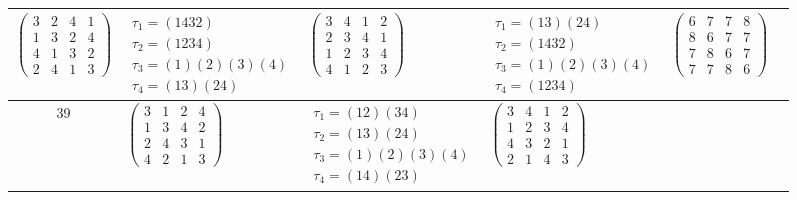 \begin{longtable}{|c|p{2.7cm}|p{2.7cm}|p{2.7cm}|p{2.7cm}|p{2.7cm}|}
    $\begin{pmatrix} 3 & 2 & 4 & 1 \\ 1 & 3 & 2 & 4 \\ 4 & 1 & 3 & 2 \\ 2 & 4 & 1 & 3 \end{pmatrix}$               &
    $\begin{array}{l}\tau_{1}=(1432)\\ \tau_{2}=(1234)\\ \tau_{3}=(1)(2)(3)(4)\\ \tau_{4}=(13)(24)\end{array}$     &
    $\begin{pmatrix} 3 & 4 & 1 & 2 \\ 2 & 3 & 4 & 1 \\ 1 & 2 & 3 & 4 \\ 4 & 1 & 2 & 3 \end{pmatrix}$               &
    $\begin{array}{l}\tau_{1}=(13)(24)\\ \tau_{2}=(1432)\\ \tau_{3}=(1)(2)(3)(4)\\ \tau_{4}=(1234)\end{array}$     &
    $\begin{pmatrix} 6 & 7 & 7 & 8 \\ 8 & 6 & 7 & 7 \\ 7 & 8 & 6 & 7 \\ 7 & 7 & 8 & 6 \end{pmatrix}$                                                                                           \\
    \hline
    39                                                                                                             &
    $\begin{pmatrix} 3 & 1 & 2 & 4 \\ 1 & 3 & 4 & 2 \\ 2 & 4 & 3 & 1 \\ 4 & 2 & 1 & 3 \end{pmatrix}$               &
    $\begin{array}{l}\tau_{1}=(12)(34)\\ \tau_{2}=(13)(24)\\ \tau_{3}=(1)(2)(3)(4)\\ \tau_{4}=(14)(23)\end{array}$ &
    $\begin{pmatrix} 3 & 4 & 1 & 2 \\ 1 & 2 & 3 & 4 \\ 4 & 3 & 2 & 1 \\ 2 & 1 & 4 & 3 \end{pmatrix}$               &

\end{longtable}
